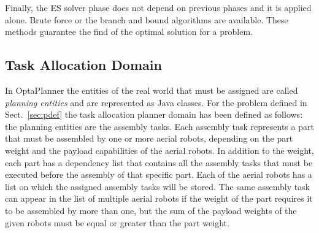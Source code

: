 \documentclass[letterpaper, 10 pt, conference]{ieeeconf}  %
\begin{document}
Finally, the ES solver phase does not depend on previous phases and it is applied alone. Brute force or the branch and bound algorithms are available. These methods guarantee the find of the optimal solution for a problem.


\subsection{Task Allocation Domain}
\label{sec:optaplanner_domain}

In OptaPlanner the entities of the real world that must be assigned are called \emph{planning entities} and are represented as Java classes. For the problem defined in Sect.~\ref{sec:pdef} the task allocation planner domain has been defined as follows: the planning entities are the assembly tasks. Each assembly task represents a part that must be assembled by one or more aerial robots, depending on the part weight and the payload capabilities of the aerial robots. In addition to the weight, each part has a dependency list that contains all the assembly tasks that must be executed before the assembly of that specific part. Each of the aerial robots has a list on which the assigned assembly tasks will be stored. The same assembly task can appear in the list of multiple aerial robots if the weight of the part requires it to be assembled by more than one, but the sum of the payload weights of the given robots must be equal or greater than the part weight. 

\end{document}
